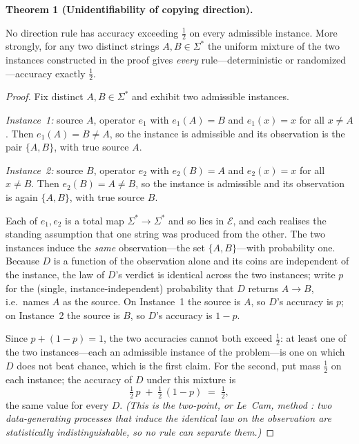 \documentclass[11pt,letterpaper]{article}
\begin{document}
\begin{propbox}
{\headfont\bfseries\color{marine} Theorem 1 (Unidentifiability of copying direction).}\par\vspace{4pt}
\noindent No direction rule has accuracy exceeding $\tfrac12$ on every admissible instance. More strongly, for any two distinct strings $A,B\in\Sigma^\ast$ the uniform mixture of the two instances constructed in the proof gives \emph{every} rule---deterministic or randomized---accuracy exactly $\tfrac12$.
\end{propbox}

\begin{proof}
Fix distinct $A,B\in\Sigma^\ast$ and exhibit two admissible instances.

\emph{Instance~1:} source $A$, operator $e_1$ with $e_1(A)=B$ and $e_1(x)=x$ for all $x\neq A$. Then $e_1(A)=B\neq A$, so the instance is admissible and its observation is the pair $\{A,B\}$, with true source $A$.

\emph{Instance~2:} source $B$, operator $e_2$ with $e_2(B)=A$ and $e_2(x)=x$ for all $x\neq B$. Then $e_2(B)=A\neq B$, so the instance is admissible and its observation is again $\{A,B\}$, with true source $B$.

Each of $e_1,e_2$ is a total map $\Sigma^\ast\!\to\!\Sigma^\ast$ and so lies in $\mathcal{E}$, and each realises the standing assumption that one string was produced from the other. The two instances induce the \emph{same} observation---the set $\{A,B\}$---with probability one. Because $D$ is a function of the observation alone and its coins are independent of the instance, the law of $D$'s verdict is identical across the two instances; write $p$ for the (single, instance-independent) probability that $D$ returns $A\!\to\!B$, i.e.\ names $A$ as the source. On Instance~1 the source is $A$, so $D$'s accuracy is $p$; on Instance~2 the source is $B$, so $D$'s accuracy is $1-p$.

Since $p+(1-p)=1$, the two accuracies cannot both exceed $\tfrac12$: at least one of the two instances---each an admissible instance of the problem---is one on which $D$ does not beat chance, which is the first claim. For the second, put mass $\tfrac12$ on each instance; the accuracy of $D$ under this mixture is
\[
  \tfrac12\,p \;+\; \tfrac12\,(1-p) \;=\; \tfrac12 ,
\]
the same value for every $D$. \emph{(This is the two-point, or Le~Cam, method \citep{tsybakov2009}: two data-generating processes that induce the identical law on the observation are statistically indistinguishable, so no rule can separate them.)}
\end{proof}
\end{document}
